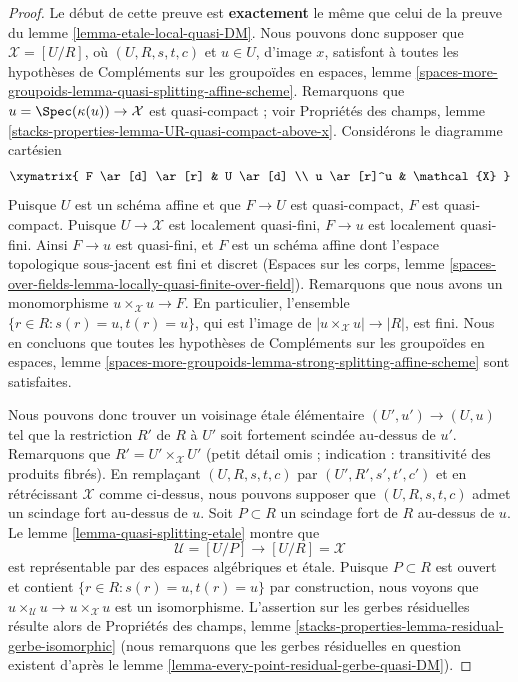 \begin{proof}
Le d\'ebut de cette preuve est {\bf exactement} le m\^eme que celui de la preuve
du lemme \ref{lemma-etale-local-quasi-DM}.
Nous pouvons donc supposer que $\mathcal{X} = [U/R]$, o\`u $(U, R, s, t, c)$
et $u \in U$, d'image $x$, satisfont \`a toutes les hypoth\`eses de
Compl\'ements sur les groupo\"ides en espaces, lemme
\ref{spaces-more-groupoids-lemma-quasi-splitting-affine-scheme}.
Remarquons que $u = \Spec(\kappa(u)) \to \mathcal{X}$ est quasi-compact ; voir
Propri\'et\'es des champs, lemme
\ref{stacks-properties-lemma-UR-quasi-compact-above-x}.
Consid\'erons le diagramme cart\'esien
$$
\xymatrix{
F \ar[d] \ar[r] & U \ar[d] \\
u \ar[r]^u & \mathcal{X}
}
$$
Puisque $U$ est un sch\'ema affine et que $F \to U$ est quasi-compact,
$F$ est quasi-compact. Puisque $U \to \mathcal{X}$
est localement quasi-fini, $F \to u$ est
localement quasi-fini. Ainsi $F \to u$ est quasi-fini,
et $F$ est un sch\'ema affine dont l'espace topologique
sous-jacent est fini et discret (Espaces sur les corps, lemme
\ref{spaces-over-fields-lemma-locally-quasi-finite-over-field}).
Remarquons que nous avons un monomorphisme $u \times_\mathcal{X} u \to F$.
En particulier, l'ensemble $\{r \in R : s(r) = u, t(r) = u\}$,
qui est l'image de $|u \times_\mathcal{X} u| \to |R|$,
est fini. Nous en concluons que toutes les hypoth\`eses de
Compl\'ements sur les groupo\"ides en espaces, lemme
\ref{spaces-more-groupoids-lemma-strong-splitting-affine-scheme}
sont satisfaites.

\medskip\noindent
Nous pouvons donc trouver un voisinage \'etale \'el\'ementaire
$(U', u') \to (U, u)$ tel que la restriction $R'$ de $R$ \`a $U'$
soit fortement scind\'ee au-dessus de $u'$. Remarquons que $R' = U' \times_\mathcal{X} U'$
(petit d\'etail omis ; indication : transitivit\'e des produits fibr\'es).
En rempla\c{c}ant $(U, R, s, t, c)$ par $(U', R', s', t', c')$ et en r\'etr\'ecissant
$\mathcal{X}$ comme ci-dessus, nous pouvons supposer que $(U, R, s, t, c)$ admet
un scindage fort au-dessus de $u$. Soit $P \subset R$ un scindage fort
de $R$ au-dessus de $u$. Le lemme \ref{lemma-quasi-splitting-etale} montre que
$$
\mathcal{U} = [U/P] \longrightarrow [U/R] = \mathcal{X}
$$
est repr\'esentable par des espaces alg\'ebriques et \'etale. Puisque $P \subset R$
est ouvert et contient $\{r \in R : s(r) = u, t(r) = u\}$ par construction,
nous voyons que
$u \times_\mathcal{U} u \to u \times_\mathcal{X} u$ est un isomorphisme.
L'assertion sur les gerbes r\'esiduelles r\'esulte alors de
Propri\'et\'es des champs, lemme
\ref{stacks-properties-lemma-residual-gerbe-isomorphic}
(nous remarquons que les gerbes r\'esiduelles en question existent d'apr\`es
le lemme \ref{lemma-every-point-residual-gerbe-quasi-DM}).
\end{proof}



